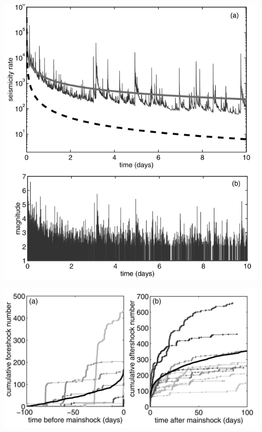 \documentclass[aspectratio=43,9pt]{beamer}
\begin{document}
\begin{frame}
 {}
 
 \begin{minipage}{0.48\linewidth}
   \includegraphics[width=1\linewidth]{Figs/fig1}
 \end{minipage}
 \begin{minipage}{0.48\linewidth}

 \end{minipage}

 
\end{frame}


\begin{frame}
 {}
 
 \begin{minipage}{0.48\linewidth}
   \includegraphics[width=1\linewidth]{Figs/fig2}
 \end{minipage}
 \begin{minipage}{0.48\linewidth}

 \end{minipage}

 
\end{frame}
\end{document}
